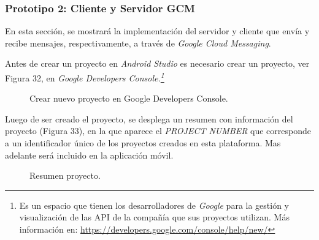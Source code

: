 \subsubsection{Prototipo 2: Cliente y Servidor GCM}

En esta sección, se mostrará la implementación del servidor y cliente que envía y recibe mensajes, respectivamente, a través de \textit{Google Cloud Messaging}.\\  


Antes de crear un proyecto en \textit{Android Studio} es necesario crear un proyecto, ver Figura 32, en \textit{Google Developers Console.\footnote{Es un espacio que tienen los desarrolladores de \textit{Google} para la gestión y visualización de las API de la compañía que sus proyectos utilizan. Más información en: \url{https://developers.google.com/console/help/new/}}}\\


\begin{figure}[H]
\centering
\setlength\fboxsep{0pt}
\setlength\fboxrule{0.5pt}
\caption{Crear nuevo proyecto en Google Developers Console.}
\label{gdc}
\end{figure}

Luego de ser creado el proyecto, se desplega un resumen con información del proyecto (Figura 33), en la que aparece el \textit{PROJECT NUMBER} que corresponde a un identificador único de los proyectos creados en esta plataforma. Mas adelante será incluido en la aplicación móvil.\\

\begin{figure}[H]
\centering
\setlength\fboxsep{0pt}
\setlength\fboxrule{0.5pt}
\caption{Resumen proyecto.}
\label{resumenProyecto}
\end{figure}

